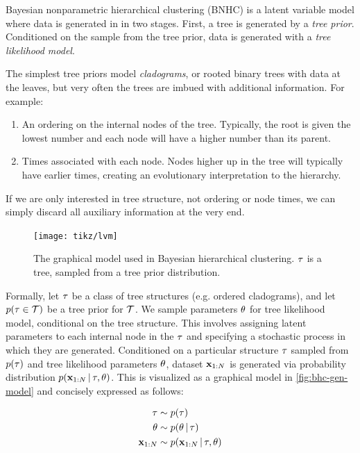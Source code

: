 Bayesian nonparametric hierarchical clustering (BNHC)
is a latent variable model where
data is generated in
in two stages.
First, a tree is generated by a
\emph{tree prior}.
Conditioned on the sample
from the tree prior,
data is generated with
a \emph{tree likelihood model}.

The simplest tree priors
model \emph{cladograms},
or rooted binary trees
with data at the leaves,
but very often the trees are imbued with
additional information.
For example:

\begin{enumerate}
  \item An ordering on the internal nodes of the tree.
    Typically, the root is given the lowest number and
    each node will have a higher number than its parent.
  \item Times associated with each node.
    Nodes higher up in the tree will typically have
    earlier times, creating an evolutionary
    interpretation to the hierarchy.
\end{enumerate}

If we are only interested in tree structure,
not ordering or node times, we can simply discard
all auxiliary information at the very end.

\begin{figure}[H]
  \centering
  \texttt{[image: tikz/lvm]}
  \caption{The graphical model used
  in Bayesian hierarchical clustering. $\tau$
  is a tree, sampled from a tree prior distribution.}
  \label{fig:bhc-gen-model}
\end{figure}

Formally,
let $\tau$ be a class
of tree structures (e.g. ordered cladograms),
and let $p(\tau \in \mathcal{T})$
be a tree prior
for $\mathcal{T}$.
We sample parameters $\theta$ for tree likelihood model,
conditional on the tree structure.
This involves assigning
latent parameters to each internal node in the $\tau$
and specifying a stochastic process in which they are generated.
Conditioned on a particular
structure $\tau$ sampled from $p(\tau)$
and tree likelihood parameters $\theta$, dataset
$\mathbf{x}_{1:N}$
is generated
via probability distribution $p(\mathbf{x}_{1:N} \,|\, \tau, \theta)$.
This is visualized as a graphical model in \autoref{fig:bhc-gen-model}
and concisely expressed as follows:

\begin{align*}
  \tau &\sim p(\tau) \\
  \theta &\sim p(\theta \,|\, \tau) \\
  \mathbf{x}_{1:N} &\sim p(\mathbf{x}_{1:N} \,|\, \tau, \theta)
\end{align*}

